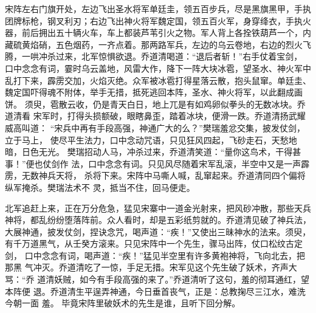 宋阵左右门旗开处，左边飞出圣水将军单廷圭，领五百步兵，尽是黑旗黑甲，手执
团牌标枪，钢叉利刃；右边飞出神火将军魏定国，领五百火军，身穿绛衣，手执火
器，前后拥出五十辆火车，车上都装芦苇引火之物。军人背上各拴铁葫芦一个，内
藏硫黄焰硝，五色烟药，一齐点着。那两路军兵，左边的乌云卷地，右边的烈火飞
腾，一哄冲杀过来，北军惊惧欲退。乔道清喝道：“退后者斩！”右手仗着宝剑，
口中念念有词，霎时乌云盖地，风雷大作，降下一阵大块冰雹，望圣水、神火军中
乱打下来，霹雳交加，火焰灭绝。众军被冰雹打得星落云散，抱头鼠窜。单廷圭、
魏定国吓得魂不附体，举手无措，抵死逃回本阵，圣水、神火将军，以此翻成画饼。
须臾，雹散云收，仍是青天白日，地上兀是有如鸡卵似拳头的无数冰块。乔道清看
宋军时，打得头损额破，眼瞎鼻歪，踏着冰块，便滑一跌。乔道清扬武耀威高叫道：
“宋兵中再有手段高强，神通广大的么？”樊瑞羞忿交集，披发仗剑，立于马上，
使尽平生法力，口中念动咒语，只见狂风四起，飞砂走石，天愁地暗，日色无光。
樊瑞招动人马，冲杀过来，乔道清笑道：“量你这鸟术，干得甚事！”便也仗剑作
法，口中念念有词。只见风尽随着宋军乱滚，半空中又是一声霹雳，无数神兵天将，
杀将下来。宋阵中马嘶人喊，乱窜起来。乔道清同四个偏将纵军掩杀。樊瑞法术不
灵，抵当不住，回马便走。

北军追赶上来，正在万分危急，猛见宋寨中一道金光射来，把风砂冲散，那些天兵
神将，都乱纷纷堕落阵前。众人看时，却是五彩纸剪就的。乔道清见破了神兵法，
大展神通，披发仗剑，捏诀念咒，喝声道：“疾！”又使出三昧神水的法来。须臾，
有千万道黑气，从壬癸方滚来。只见宋阵中一个先生，骤马出阵，仗口松纹古定剑，
口中念念有词，喝声道：“疾！”猛见半空里有许多黄袍神将，飞向北去，把那黑
气冲灭。乔道清吃了一惊，手足无措。宋军见这个先生破了妖术，齐声大骂：“乔
道清妖贼，如今有手段高强的来了。”乔道清听了这句，羞的彻耳通红，望本阵便
退。乔道清生平逞弄神通，今日垂首丧气，正是：总教掬尽三江水，难洗今朝一面
羞。
毕竟宋阵里破妖术的先生是谁，且听下回分解。